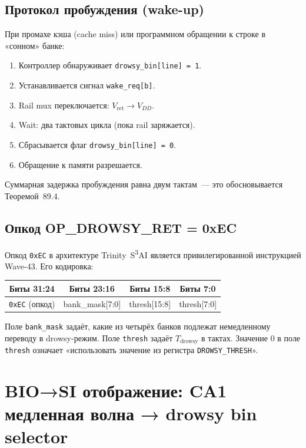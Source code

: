 \subsection{Протокол пробуждения (wake-up)}

При промахе кэша (cache miss) или программном обращении
к строке в «сонном» банке:
\begin{enumerate}
  \item Контроллер обнаруживает \texttt{drowsy\_bin[line]~=~1}.
  \item Устанавливается сигнал \texttt{wake\_req[b]}.
  \item Rail mux переключается: $V_\mathrm{ret} \rightarrow V_{DD}$.
  \item Wait: два тактовых цикла (пока rail заряжается).
  \item Сбрасывается флаг \texttt{drowsy\_bin[line]~=~0}.
  \item Обращение к памяти разрешается.
\end{enumerate}
Суммарная задержка пробуждения равна двум тактам~--- это
обосновывается Теоремой~89.4.

\subsection{Опкод OP\_DROWSY\_RET = 0xEC}

Опкод \texttt{0xEC} в архитектуре Trinity~S\textsuperscript{3}AI
является привилегированной инструкцией Wave-43.
Его кодировка:
%
\begin{center}
\begin{tabular}{|c|c|c|c|}
  \hline
  \textbf{Биты 31:24} & \textbf{Биты 23:16} & \textbf{Биты 15:8} & \textbf{Биты 7:0} \\
  \hline
  \texttt{0xEC} (опкод) & bank\_mask[7:0] & thresh[15:8] & thresh[7:0] \\
  \hline
\end{tabular}
\end{center}
%
Поле \texttt{bank\_mask} задаёт, какие из четырёх банков
подлежат немедленному переводу в drowsy-режим.
Поле \texttt{thresh} задаёт $T_\mathrm{drowsy}$ в тактах.
Значение 0 в поле \texttt{thresh} означает «использовать
значение из регистра \texttt{DROWSY\_THRESH}».

\section{BIO→SI отображение: CA1 медленная волна → drowsy bin selector}
\label{sec:glava89-bio}

